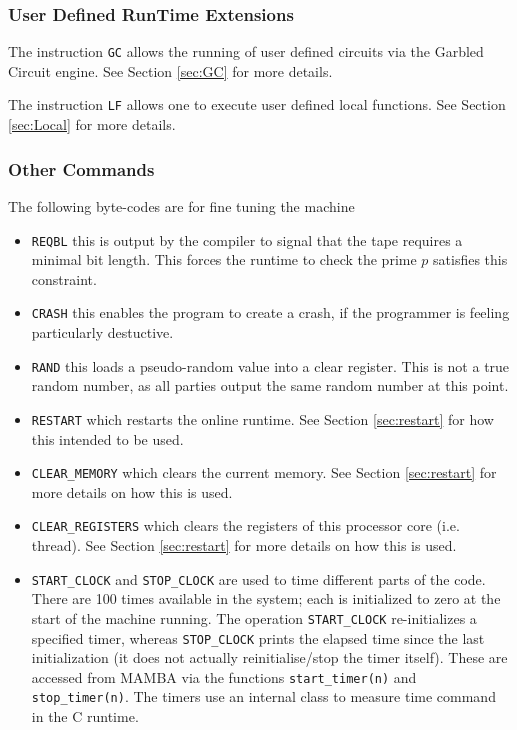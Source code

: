 \subsubsection{User Defined RunTime Extensions}
The instruction \verb+GC+ allows the running of user defined
circuits via the Garbled Circuit engine.
See Section \ref{sec:GC} for more details.

The instruction \verb|LF| allows one to execute user defined
local functions.
See Section \ref{sec:Local} for more details.

\subsubsection{Other Commands}
The following byte-codes are for fine tuning the machine
\begin{itemize}
\item \verb+REQBL+ this is output by the compiler to signal that
the tape requires a minimal bit length. This forces the runtime
to check the prime $p$ satisfies this constraint.
\item \verb+CRASH+ this enables the program to create a crash,
if the programmer is feeling particularly destuctive.
\item \verb+RAND+ this loads a pseudo-random value into a
clear register. This is not a true random number, as all
parties output the same random number at this point.
\item \verb+RESTART+ which restarts the online runtime.
See Section \ref{sec:restart} for how this intended to be used.
\item \verb+CLEAR_MEMORY+ which clears the current memory.
See Section \ref{sec:restart} for more details on how this is used.
\item \verb+CLEAR_REGISTERS+ which clears the registers of this processor core (i.e. thread).
See Section \ref{sec:restart} for more details on how this is used.
\item \verb+START_CLOCK+ and \verb+STOP_CLOCK+ are used to time different
parts of the code. There are 100 times available in the system;
each is initialized to zero at the start of the machine running.
The operation \verb+START_CLOCK+ re-initializes a specified timer,
whereas \verb+STOP_CLOCK+ prints the elapsed time since the last
initialization (it does not actually reinitialise/stop the timer itself).
These are accessed from MAMBA via the functions
\verb+start_timer(n)+ and \verb+stop_timer(n)+.
The timers use an internal class to measure time command in the C runtime.
\end{itemize}

